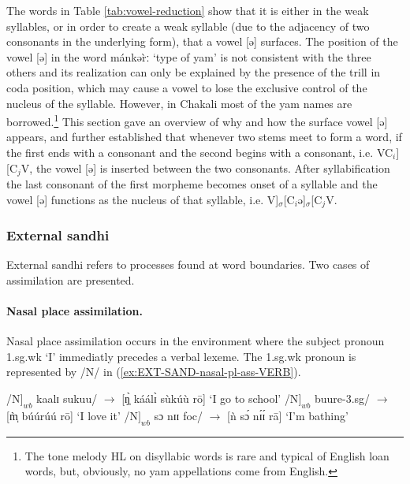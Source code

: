 The words in Table \ref{tab:vowel-reduction} show  that it is either in the weak
syllables, or in order to create
a weak syllable (due to the adjacency of two consonants in the underlying form),
 that a vowel [{\sls ə}] surfaces. The position of the vowel [{\sls ə}] in 
the word {\sls mánkər̀ː} `type of yam'  is not consistent with the three others 
and 
  its realization can only be explained by the presence of the trill in coda
position,
which may cause a vowel to lose the exclusive control of the nucleus of the
syllable. However, in Chakali most of the yam names are
borrowed.\footnote{The tone melody HL on disyllabic words is rare and
typical
of English loan words,  but, obviously, no yam appellations come from English.}
This section gave an overview of why and how the surface vowel [{\sls ə}] 
appears, and
further established that whenever two stems meet to form a word, if the first 
ends with a consonant and the second begins with a consonant, i.e.
VC$_{i}$][C$_{j}$V, the vowel [{\sls ə}] is inserted between the two 
consonants. 
After
syllabification the last consonant of the first morpheme becomes onset of a
syllable and the vowel [{\sls ə}] functions as the nucleus of that syllable, 
i.e.
V]$_{\sigma}$[C$_{i}$ə]$_{\sigma}$[C$_{j}$V. 






\subsubsection{External sandhi}
External sandhi refers to processes found at word boundaries.  Two cases
of  assimilation are presented.

\paragraph{Nasal place assimilation.}
\label{sec:ext-nasal-place}

Nasal place assimilation occurs in the environment where the subject pronoun
 {\sc 1.sg.wk} `I'  immediatly precedes a verbal lexeme.  The  {\sc 1.sg.wk} 
pronoun is represented by  /N/
in
(\ref{ex:EXT-SAND-nasal-pl-ass-VERB}).

\begin{exe}
\ex\label{ex:EXT-SAND-nasal-pl-ass-VERB} 
\begin{xlist}
 \ex\label{ex:EXT-SAND-N} 
/N$]_{wb}$ kaalɪ sukuu/ $\rightarrow$ [ŋ̩̀ káálɪ̀ sùkúù rō] {\rm `I go to 
school'}
 \ex\label{ex:EXT-SAND-m} 
/N$]_{wb}$ buure-{\sc 3.sg}/   $\rightarrow$  [m̩̀ búúrúú rō] {\rm `I love 
it'}
 \ex\label{ex:EXT-SAND-n} 
/N$]_{wb}$ sɔ nɪɪ {\sc foc}/   $\rightarrow$  [ǹ sɔ́  nɪ́ɪ́ rā] {\rm  `I'm 
bathing'}
\end{xlist}
\end{exe}

